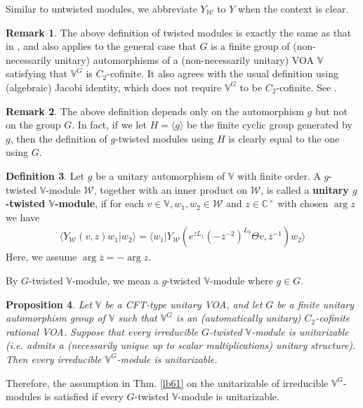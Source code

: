 \documentclass[11pt,b5paper,notitlepage]{article}
\theoremstyle{definition}
\newtheorem{df}{Definition}[section]
\newtheorem{rem}[df]{Remark}
\theoremstyle{plain}
\newtheorem{pp}[df]{Proposition}
\newcommand{\mc}{\mathcal}
\newcommand{\ovl}{\overline}
\newcommand{\bk}[1]{\langle {#1}\rangle}
\newcommand{\Vbb}{\mathbb V}
\newcommand{\Cbb}{\mathbb C}
\numberwithin{equation}{section}
\begin{document}
Similar to untwisted modules, we abbreviate $Y_{\mc W}$ to $Y$ when the context is clear.


\begin{rem}
The above definition of twisted modules is exactly the same as that in \cite{McR21}, and also applies to the general case that $G$ is a finite group of (non-necessarily unitary) automorphisms of a (non-necessarily unitary) VOA $\Vbb$ satisfying that $\Vbb^G$ is $C_2$-cofinite. It also agrees with the usual definition using (algebraic) Jacobi identity, which does not require $\Vbb^G$ to be $C_2$-cofinite.  See \cite{Hua10}. 
\end{rem}


\begin{rem}
The above definition depends only on the automorphism $g$ but not on the group $G$. In fact, if we let $H=\bk{g}$ be the finite cyclic group generated by $g$, then the definition of $g$-twisted modules using $H$ is clearly equal to the one using $G$.
\end{rem}




\begin{df}
Let $g$ be a unitary automorphism of $\Vbb$ with finite order. A $g$-twisted $\Vbb$-module $\mc W$, together with an inner product on $\mc W$, is called a \textbf{unitary $g$-twisted $\Vbb$-module}, if for each $v\in\Vbb,w_1,w_2\in\mc W$ and $z\in\Cbb^\times$ with chosen $\arg z$ we have
\begin{align}
\bk{Y_{\mc W}(v,z)w_1|w_2}=\bk{w_1|Y_{\mc W}(e^{\ovl zL_1}(-\ovl z^{-2})^{L_0}\Theta v,\ovl z^{-1})w_2  }
\end{align} 
Here, we assume $\arg\ovl z=-\arg z$.
\end{df}


By $G$-twisted $\Vbb$-module, we mean a $g$-twisted $\Vbb$-module where $g\in G$.

\begin{pp}\label{lb66}
Let $\Vbb$ be a CFT-type unitary VOA, and let $G$ be a finite unitary automorphism group of $\Vbb$ such that $\Vbb^G$ is an (automatically unitary) $C_2$-cofinite rational VOA. Suppose that every irreducible $G$-twisted $\Vbb$-module is unitarizable (i.e. admits a (necessarily unique up to scalar multiplications) unitary structure). Then every irreducible $\Vbb^G$-module is unitarizable.
\end{pp}

Therefore, the assumption in Thm. \ref{lb61} on the unitarizable of irreducible $\Vbb^G$-modules is satisfied if every $G$-twisted $\Vbb$-module is unitarizable. 
\end{document}
